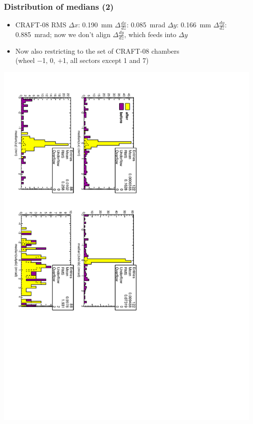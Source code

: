 \documentclass[compress]{beamer}
\begin{document}
\begin{frame}
\frametitle{Distribution of medians (2)}
\begin{itemize}
\item CRAFT-08 RMS $\Delta x$: 0.190~mm $\Delta \frac{dx}{dz}$: 0.085~mrad $\Delta y$: 0.166~mm $\Delta \frac{dy}{dz}$: 0.885~mrad; now we don't align $\Delta \frac{dy}{dz}$, which feeds into $\Delta y$
\item Now also restricting to the set of CRAFT-08 chambers \\ (wheel $-$1, 0, $+$1, all sectors except 1 and 7)
\end{itemize}

\includegraphics[height=\linewidth, angle=90]{NOV4DT_median_goodDT.pdf}
\end{frame}
\end{document}
